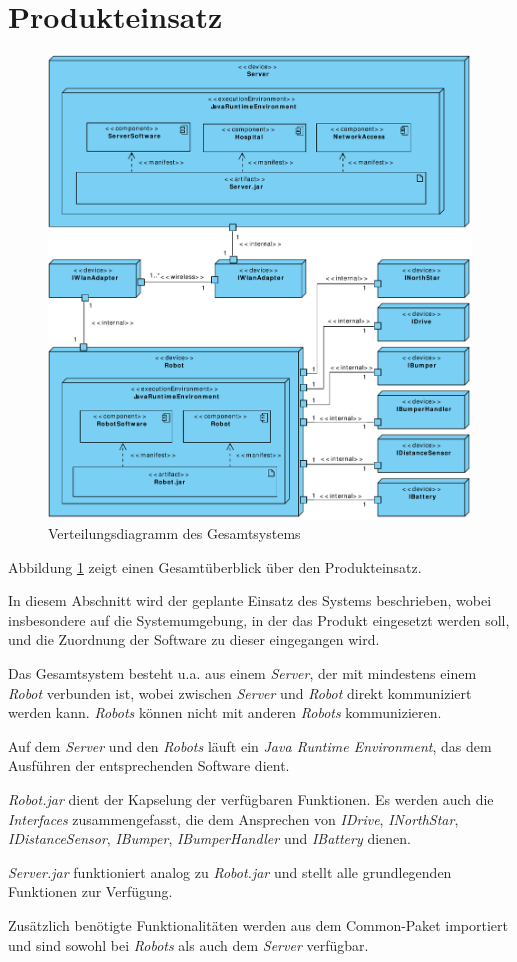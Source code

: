 \section{Produkteinsatz}

\begin{figure}[H]
\centering
\includegraphics[width=1\textwidth]{img/1-Entwurf-9-Produkteinsatz}
\caption{Verteilungsdiagramm des Gesamtsystems}
\label{ProdukteinsatzKomp}
\end{figure}

Abbildung \ref{ProdukteinsatzKomp} zeigt einen Gesamtüberblick über den Produkteinsatz.

In diesem Abschnitt wird der geplante Einsatz des Systems beschrieben, wobei insbesondere auf die Systemumgebung, in der das Produkt eingesetzt werden soll, und die Zuordnung der Software zu dieser eingegangen wird.

Das Gesamtsystem besteht u.a. aus einem \emph{Server}, der mit mindestens einem \emph{Robot} verbunden ist, wobei zwischen \emph{Server} und \emph{Robot} direkt kommuniziert werden kann. \emph{Robots} können nicht mit anderen \emph{Robots} kommunizieren.

Auf dem \emph{Server} und den \emph{Robots} läuft ein \emph{Java Runtime Environment}, das dem Ausführen der entsprechenden Software dient.

\emph{Robot.jar} dient der Kapselung der verfügbaren Funktionen. Es werden auch die \emph{Interfaces} zusammengefasst, die dem Ansprechen von \emph{IDrive}, \emph{INorthStar}, \emph{IDistanceSensor}, \emph{IBumper}, \emph{IBumperHandler} und \emph{IBattery} dienen.

\emph{Server.jar} funktioniert analog zu \emph{Robot.jar} und stellt alle grundlegenden Funktionen zur Verfügung.

Zusätzlich benötigte Funktionalitäten werden aus dem Common-Paket importiert und sind sowohl bei \emph{Robots} als auch dem \emph{Server} verfügbar.
